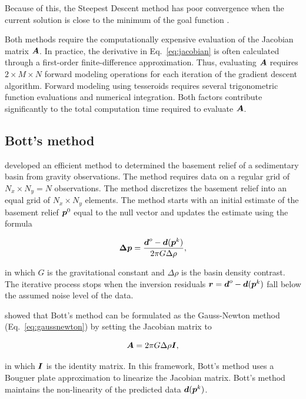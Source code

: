 \documentclass[extra]{gji}
\newcommand{\eq}[1]{Eq.~\ref{eq:#1}}
\newcommand{\mbf}[1]{\hbox{\mathversion{bold}$#1$}}
\begin{document}
\noindent
Because of this, the Steepest Descent method has poor convergence when the
current solution is close to the minimum of the goal function
\citep{kelley_iterative_1987}.

Both methods require the computationally expensive evaluation of the Jacobian
matrix $\mbf{A}$.
In practice, the derivative in \eq{jacobian} is often calculated through a
first-order finite-difference approximation.
Thus, evaluating $\mbf{A}$ requires $2\times M \times N$ forward modeling
operations for each iteration of the gradient descent algorithm.
Forward modeling using tesseroids requires several trigonometric function
evaluations and numerical integration.
Both factors contribute significantly to the total computation time required to
evaluate $\mbf{A}$.


\subsection{Bott's method}

\citet{bott_use_1960} developed an efficient method to determined the basement
relief of a sedimentary basin from gravity observations.
The method requires data on a regular grid of $N_x \times N_y = N$
observations.
The method discretizes the basement relief into an equal grid of $N_x \times
N_y$ elements.
The method starts with an initial estimate of the basement relief
$\mbf{p}^0$ equal to the null vector and updates the estimate using the formula


\begin{equation}
    \mbf{\Delta p} = \dfrac{\mbf{d}^o - \mbf{d}(\mbf{p}^k)}{2\pi G \Delta \rho},
    \label{eq:bott}
\end{equation}

\noindent
in which $G$ is the gravitational constant and $\Delta \rho$ is the basin
density contrast.
The iterative process stops when the inversion residuals
$\mbf{r} = \mbf{d}^o - \mbf{d}(\mbf{p}^k)$ fall below the assumed noise level
of the data.

\citet{silva_fast_2014} showed that Bott's method can be formulated as
the Gauss-Newton method (\eq{gaussnewton})
by setting the Jacobian matrix to

\begin{equation}
    \mbf{A} = 2\pi G \Delta \rho \mbf{I},
    \label{eq:bott-jacobian}
\end{equation}

\noindent
in which $\mbf{I}$ is the identity matrix.
In this framework, Bott's method uses a Bouguer plate approximation to
linearize the Jacobian matrix.
Bott's method maintains the non-linearity of the predicted data
$\mbf{d}(\mbf{p}^k)$.
\end{document}
